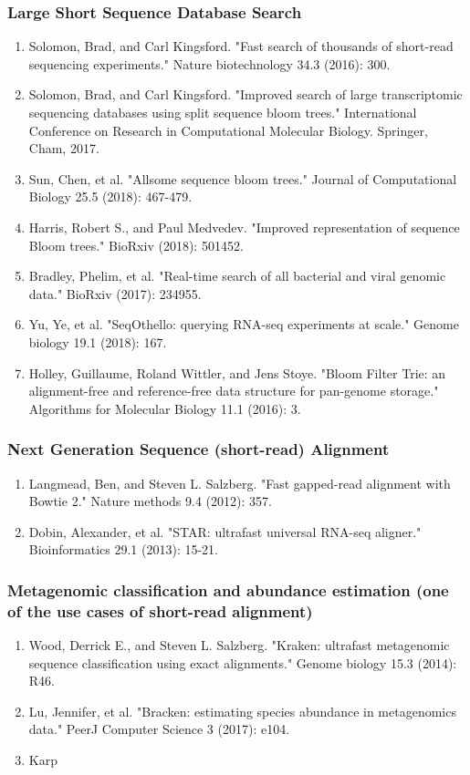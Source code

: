 \subsubsection{Large Short Sequence Database Search}
\begin{enumerate}
    \item Solomon, Brad, and Carl Kingsford. "Fast search of thousands of short-read sequencing experiments." Nature biotechnology 34.3 (2016): 300.
    \item Solomon, Brad, and Carl Kingsford. "Improved search of large transcriptomic sequencing databases using split sequence bloom trees." International Conference on Research in Computational Molecular Biology. Springer, Cham, 2017.
    \item Sun, Chen, et al. "Allsome sequence bloom trees." Journal of Computational Biology 25.5 (2018): 467-479.
    \item Harris, Robert S., and Paul Medvedev. "Improved representation of sequence Bloom trees." BioRxiv (2018): 501452.
    \item Bradley, Phelim, et al. "Real-time search of all bacterial and viral genomic data." BioRxiv (2017): 234955.
    \item Yu, Ye, et al. "SeqOthello: querying RNA-seq experiments at scale." Genome biology 19.1 (2018): 167.
    \item Holley, Guillaume, Roland Wittler, and Jens Stoye. "Bloom Filter Trie: an alignment-free and reference-free data structure for pan-genome storage." Algorithms for Molecular Biology 11.1 (2016): 3.
\end{enumerate}
\subsubsection{Next Generation Sequence (short-read) Alignment}
\begin{enumerate}
    \item Langmead, Ben, and Steven L. Salzberg. "Fast gapped-read alignment with Bowtie 2." Nature methods 9.4 (2012): 357.
    \item Dobin, Alexander, et al. "STAR: ultrafast universal RNA-seq aligner." Bioinformatics 29.1 (2013): 15-21.
\end{enumerate}
\subsubsection{Metagenomic classification and abundance estimation (one of the use cases of short-read alignment)}
\begin{enumerate}
    \item Wood, Derrick E., and Steven L. Salzberg. "Kraken: ultrafast metagenomic sequence classification using exact alignments." Genome biology 15.3 (2014): R46.
    \item Lu, Jennifer, et al. "Bracken: estimating species abundance in metagenomics data." PeerJ Computer Science 3 (2017): e104.
    \item Karp
\end{enumerate}
